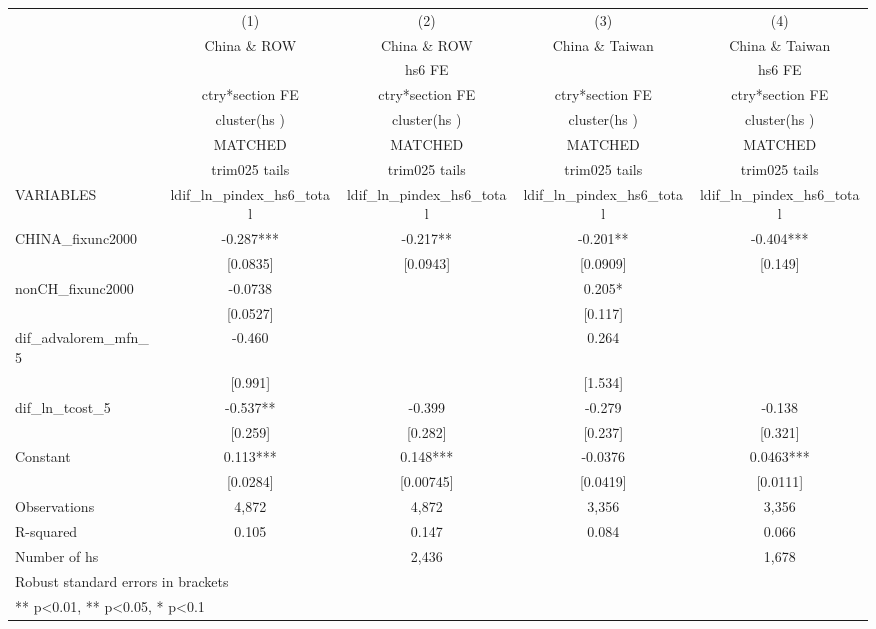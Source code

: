 \begin{tabular}{lcccc}
\toprule
 & (1) & (2) & (3) & (4) \\
 & China \& ROW & China \& ROW & China \& Taiwan & China \& Taiwan \\
 &  & hs6 FE &  & hs6 FE \\
 & ctry*section FE & ctry*section FE & ctry*section FE & ctry*section FE \\
 & cluster(hs ) & cluster(hs ) & cluster(hs ) & cluster(hs ) \\
 & MATCHED & MATCHED & MATCHED & MATCHED \\
 & trim025 tails & trim025 tails & trim025 tails & trim025 tails \\
VARIABLES & ldif\_ln\_pindex\_hs6\_total & ldif\_ln\_pindex\_hs6\_total & ldif\_ln\_pindex\_hs6\_total & ldif\_ln\_pindex\_hs6\_total \\
\midrule
CHINA\_fixunc2000 & -0.287*** & -0.217** & -0.201** & -0.404*** \\
 & [0.0835] & [0.0943] & [0.0909] & [0.149] \\
nonCH\_fixunc2000 & -0.0738 &  & 0.205* &  \\
 & [0.0527] &  & [0.117] &  \\
dif\_advalorem\_mfn\_5 & -0.460 &  & 0.264 &  \\
 & [0.991] &  & [1.534] &  \\
dif\_ln\_tcost\_5 & -0.537** & -0.399 & -0.279 & -0.138 \\
 & [0.259] & [0.282] & [0.237] & [0.321] \\
Constant & 0.113*** & 0.148*** & -0.0376 & 0.0463*** \\
 & [0.0284] & [0.00745] & [0.0419] & [0.0111] \\
\midrule
Observations & 4,872 & 4,872 & 3,356 & 3,356 \\
R-squared & 0.105 & 0.147 & 0.084 & 0.066 \\
Number of hs &  & 2,436 &  & 1,678 \\
\bottomrule
\multicolumn{5}{l}{\footnotesize Robust standard errors in brackets} \\
\multicolumn{5}{l}{\footnotesize *** p<0.01, ** p<0.05, * p<0.1} \\
\end{tabular}
